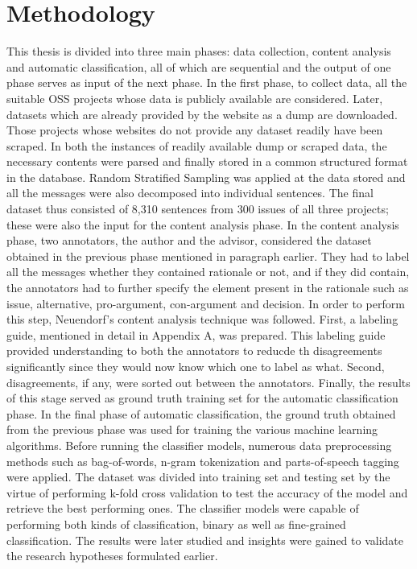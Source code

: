 \documentclass[a4paper,12pt,twoside]{report}
\begin{document}
\section{Methodology}
This thesis is divided into three main phases: data collection, content analysis and automatic classification, all of which are sequential and the output of one phase serves as input of the next phase. In the first phase, to collect data, all the suitable OSS projects whose data is publicly available are considered. Later, datasets which are already provided by the website as a dump are downloaded. Those projects whose websites do not provide any dataset readily have been scraped. In both the instances of readily available dump or scraped data, the necessary contents were parsed and finally stored in a common structured format in the database. Random Stratified Sampling was applied at the data stored and all the messages were also decomposed into individual sentences. The final dataset thus consisted of 8,310 sentences from 300 issues of all three projects; these were also the input for the content analysis phase. 
\bigbreak
In the content analysis phase, two annotators, the author and the advisor, considered the dataset obtained in the previous phase mentioned in paragraph earlier. They had to label all the messages whether they contained rationale or not, and if they did contain, the annotators had to further specify the element present in the rationale such as issue, alternative, pro-argument, con-argument and decision. In order to perform this step, Neuendorf's \cite{Neuendorf2017a} content analysis technique was followed. First, a labeling guide, mentioned in detail in Appendix A, was prepared. This labeling guide provided understanding to both the annotators to reducde th disagreements significantly since they would now know which one to label as what. Second, disagreements, if any, were sorted out between the annotators. Finally, the results of this stage served as ground truth training set for the automatic classification phase.  
\bigbreak
In the final phase of automatic classification, the ground truth obtained from the previous phase was used for training the various machine learning algorithms. Before running the classifier models, numerous data preprocessing methods such as bag-of-words, n-gram tokenization and parts-of-speech tagging were applied. The dataset was divided into training set and testing set by the virtue of performing k-fold cross validation to test the accuracy of the model and retrieve the best performing ones. The classifier models were capable of performing both kinds of classification, binary as well as fine-grained classification. The results were later studied and insights were gained to validate the research hypotheses formulated earlier.
\end{document}
